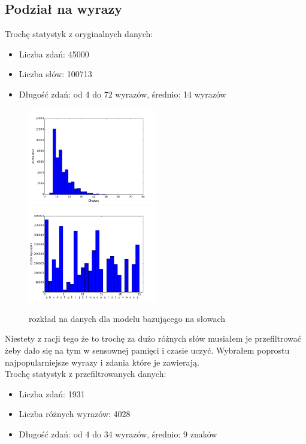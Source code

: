 \documentclass[11pt,leqno]{article}
\begin{document}
\subsection{Podział na wyrazy}
Trochę statystyk z oryginalnych danych:
\begin{itemize}
    \item Liczba zdań: 45000
    \item Liczba słów: 100713
    \item Długość zdań: od 4 do 72 wyrazów, średnio: 14 wyrazów
\end{itemize}
\begin{figure}[!h]
    \includegraphics[width=0.5\textwidth]{pictures/word_length_distribution.png}
    \includegraphics[width=0.5\textwidth]{pictures/word_letters_distribution.png}
    \caption{rozkład na danych dla modelu bazującego na słowach}
\end{figure}
\pagebreak
Niestety z racji tego że to trochę za dużo różnych słów musiałem je przefiltrować żeby dało się na tym w sensownej pamięci i czasie uczyć. Wybrałem poprostu najpopularniejsze wyrazy i zdania które je zawierają. \\
Trochę statystyk z przefiltrowanych danych:
\begin{itemize}
    \item Liczba zdań: 1931
    \item Liczba różnych wyrazów: 4028
    \item Długość zdań: od 4 do 34 wyrazów, średnio: 9 znaków
\end{itemize}
\end{document}
